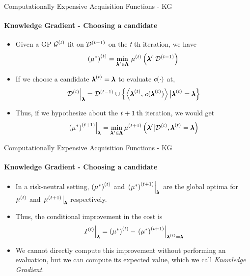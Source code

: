 \begin{frame}[c]{Computationally Expensive Acquisition Functions - KG}
\framesubtitle{Knowledge Gradient - Choosing a candidate}
\begin{itemize}\belowdisplayskip=1.5em
    \item<+-> Given a GP $\iter{\gp}$ fit on $\iter[\bocount-1]{\dataset}$ on the $\bocount\,$th iteration, we have
    \[
        \iter{\left(\mean^*\right)} = \min_{\conf'\in\pcs}\,\iter{\mean}\left(\conf'\big|\iter[\bocount-1]{\dataset}\right)
    \]
    
    \item<+-> If we choose a candidate $\bonextsample=\conf$ to evaluate $\cost(\cdot)$ at,
    \[
        \left.\iter{\dataset}\right|_{\conf} = \iter[\bocount-1]{\dataset}\cup\left\{\left\langle\bonextsample,\,\bonextobs\right\rangle\big|\bonextsample=\conf\right\}
    \]
    
    \item <+-> Thus, if we hypothesize about the $\bocount+1\,$th iteration, we would get
    \[
        \begin{split}
        \left.\iter[\bocount+1]{\left(\mean^*\right)} \right|_{\conf} 
        &= \min_{\conf'\in\pcs} \iter[\bocount+1]{\mean} \left(\conf'\big| \iter{\dataset},\bonextsample=\conf \right)\\
        \end{split}
    \]
\end{itemize}
\end{frame}
\begin{frame}[c]{Computationally Expensive Acquisition Functions - KG}
\framesubtitle{Knowledge Gradient - Choosing a candidate}
\begin{itemize}\belowdisplayskip=1.5em
    \item<+->In a risk-neutral setting, $\iter{\left(\mean^*\right)}$ and $\left.\iter[\bocount+1]{\left(\mean^*\right)}\right|_{\conf}$ are the global optima for $\iter{\mean}$ and $\left.\iter[\bocount+1]{\mean}\right|_{\conf}$ respectively.
    
    \item<+-> Thus, the conditional improvement in the cost is 
    \[
        \left.\iter{I}\right|_{\conf}=\iter{\left(\mean^*\right)} - \left.\iter[\bocount+1]{\left(\mean^*\right)} \right|_{\bonextsample=\conf}
    \]
    
    \item<+-> We cannot directly compute this improvement without performing an evaluation, but we can compute its expected value, which we call \emph{Knowledge Gradient}.
\end{itemize}
\end{frame}

